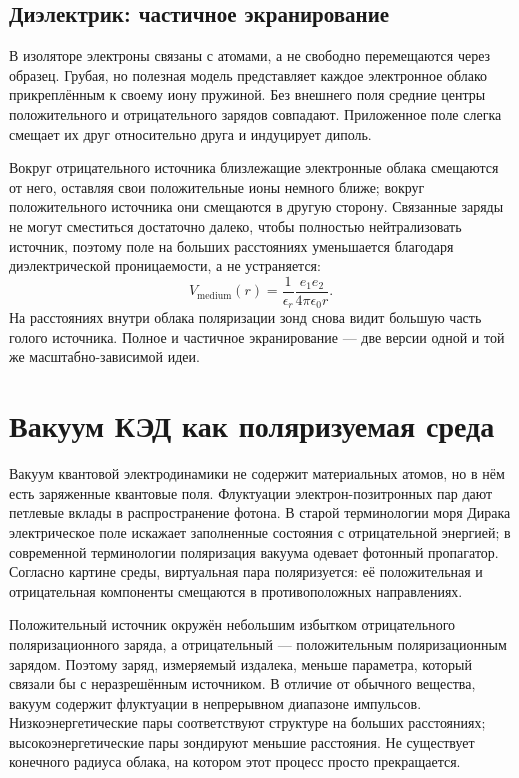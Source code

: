 \subsection{Диэлектрик: частичное экранирование}

В изоляторе электроны связаны с атомами, а не свободно перемещаются через
образец. Грубая, но полезная модель представляет каждое электронное облако
прикреплённым к своему иону пружиной. Без внешнего поля средние центры
положительного и отрицательного зарядов совпадают. Приложенное поле слегка
смещает их друг относительно друга и индуцирует диполь.

Вокруг отрицательного источника близлежащие электронные облака смещаются от него,
оставляя свои положительные ионы немного ближе; вокруг положительного источника
они смещаются в другую сторону. Связанные заряды не могут сместиться достаточно
далеко, чтобы полностью нейтрализовать источник, поэтому поле на больших
расстояниях уменьшается благодаря диэлектрической проницаемости, а не
устраняется:
\begin{equation}
  V_{\mathrm{medium}}(r)
  =
  \frac{1}{\epsilon_r}
  \frac{e_1e_2}{4\pi\epsilon_0r}.
  \label{eq:l10-dielectric-coulomb}
\end{equation}
На расстояниях внутри облака поляризации зонд снова видит большую часть
голого источника. Полное и частичное экранирование — две версии одной и той же
масштабно-зависимой идеи.

\section{Вакуум КЭД как поляризуемая среда}

Вакуум квантовой электродинамики не содержит материальных атомов, но в нём есть
заряженные квантовые поля. Флуктуации электрон-позитронных пар дают петлевые
вклады в распространение фотона. В старой терминологии моря Дирака электрическое
поле искажает заполненные состояния с отрицательной энергией; в современной
терминологии поляризация вакуума одевает фотонный пропагатор. Согласно картине
среды, виртуальная пара поляризуется: её положительная и отрицательная
компоненты смещаются в противоположных направлениях.

Положительный источник окружён небольшим избытком отрицательного
поляризационного заряда, а отрицательный — положительным поляризационным зарядом.
Поэтому заряд, измеряемый издалека, меньше параметра, который связали бы с
неразрешённым источником. В отличие от обычного вещества,
вакуум содержит флуктуации в непрерывном диапазоне импульсов. Низкоэнергетические
пары соответствуют структуре на больших расстояниях; высокоэнергетические пары
зондируют меньшие расстояния. Не существует конечного радиуса облака, на котором
этот процесс просто прекращается.

